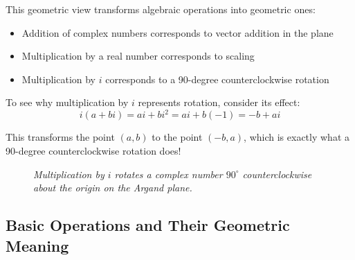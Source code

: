 \noindent This geometric view transforms algebraic operations into geometric ones:
\begin{itemize}
    \item Addition of complex numbers corresponds to vector addition in the plane
    \item Multiplication by a real number corresponds to scaling
    \item Multiplication by $i$ corresponds to a 90-degree counterclockwise rotation
\end{itemize}

\noindent To see why multiplication by $i$ represents rotation, consider its effect:
\[
i(a + bi) = ai + bi^2 = ai + b(-1) = -b + ai
\]

\noindent This transforms the point $(a,b)$ to the point $(-b,a)$, which is exactly what a 90-degree counterclockwise rotation does! \\

\begin{figure}[H]
\centering
{}
\caption{\textit{Multiplication by $i$ rotates a complex number $90^\circ$ counterclockwise about the origin on the Argand plane.}}
\label{fig:complex-rotation}
\end{figure}


\subsection*{Basic Operations and Their Geometric Meaning}

